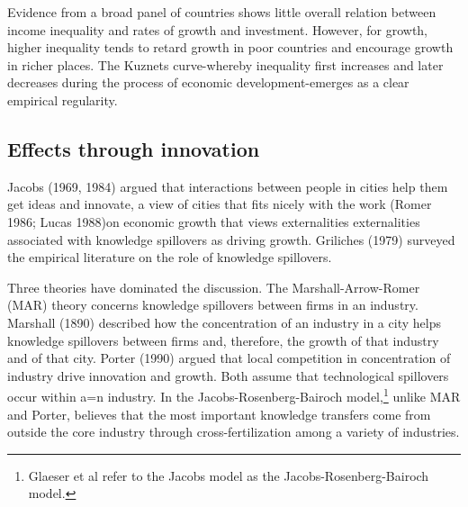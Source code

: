 


Evidence from a broad panel of countries shows little overall relation between income inequality and rates of growth and investment. However, for growth, higher inequality tends to retard growth in poor countries and encourage growth in richer places. The Kuznets curve-whereby inequality first increases and later decreases during the process of economic development-emerges as a clear empirical regularity.


\subsection{Effects through innovation}



Jacobs (1969, 1984) argued that interactions between people in cities help them get ideas and innovate, a view of cities that fits nicely with the work (Romer 1986; Lucas 1988)on economic growth that views externalities  externalities associated with knowledge spillovers as driving growth. Griliches (1979) surveyed the empirical literature on the role of knowledge spillovers. 

Three theories have dominated the discussion. The Marshall-Arrow-Romer (MAR) theory concerns knowledge spillovers between firms in an industry.  Marshall (1890) described how the concentration of an industry in a city helps knowledge
spillovers between firms and, therefore, the growth of that industry and of that city. Porter (1990) argued that local competition in concentration of industry drive innovation and growth. Both assume that technological spillovers occur within a=n industry. In the Jacobs-Rosenberg\cite{rosenbergTechnologicalChangeMachine1963}-Bairoch \cite{bairochCitiesEconomicDevelopment1988} model,\footnote{Glaeser et al \cite{glaeserGrowthCities1991} refer to the Jacobs model as the Jacobs-Rosenberg\cite{rosenbergTechnologicalChangeMachine1963}-Bairoch \cite{bairochCitiesEconomicDevelopment1988} model. } unlike MAR and Porter, believes that the most important knowledge transfers come from outside the core industry through cross-fertilization among a variety  of  industries.

